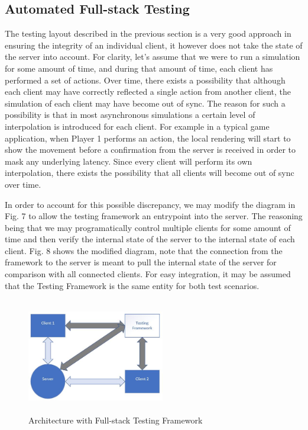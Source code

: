 \documentclass[conference]{IEEEtran}
\begin{document}
\subsection{Automated Full-stack Testing}

The testing layout described in the previous section is a very good approach in ensuring the integrity of an individual client, it however does not take the state of the server into account.
For clarity, let's assume that we were to run a simulation for some amount of time, and during that amount of time, each client has performed a set of actions. Over time, there exists a possibility that 
although each client may have correctly reflected a single action from another client, the simulation of each client may have become out of sync. The reason for such a possibility is that in most 
asynchronous simulations a certain level of interpolation is introduced for each client. For example in a typical game application, when Player 1 performs an action, the local
rendering will start to show the movement before a confirmation from the server is received in order to mask any underlying latency. Since every client will perform its own interpolation, 
there exists the possibility that all clients will become out of sync over time. 

In order to account for this possible discrepancy, we may modify the diagram in Fig. 7 to allow the testing framework an entrypoint into the server. The reasoning being that we may programatically
control multiple clients for some amount of time and then verify the internal state of the server to the internal state of each client. Fig. 8 shows the modified diagram, note that the connection
from the framework to the server is meant to pull the internal state of the server for comparison with all connected clients. For easy integration, it may be assumed that the Testing Framework
is the same entity for both test scenarios.

\begin{figure}[htbp]
\centerline{\includegraphics [width = 6cm, height = 5cm] {images/FullStackTestingDiagram.jpg}}
\caption{Architecture with Full-stack Testing Framework}
\end{figure}
\end{document}
